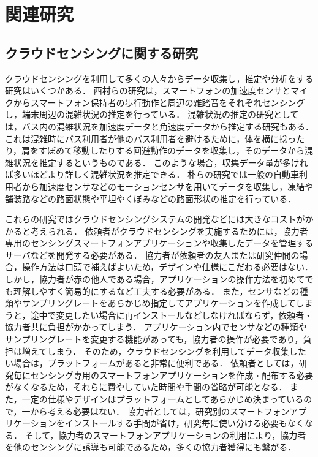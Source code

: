 \thispagestyle{myheadings}
\chapter{関連研究}
\label{sec:format}


\section{クラウドセンシングに関する研究}
\label{sec:format_thesis}
クラウドセンシングを利用して多くの人々からデータ収集し，推定や分析をする研究はいくつかある．
西村らの研究\cite{ura}は，スマートフォンの加速度センサとマイクからスマートフォン保持者の歩行動作と周辺の雑踏音をそれぞれセンシングし，端末周辺の混雑状況の推定を行っている．
混雑状況の推定の研究としては，バス内の混雑状況を加速度データと角速度データから推定する研究\cite{hoso}もある．
これは混雑時にバス利用者が他のバス利用者を避けるために，体を横に捻ったり，肩をすぼめて移動したりする回避動作のデータを収集し，そのデータから混雑状況を推定するというものである．
このような場合，収集データ量が多ければ多いほどより詳しく混雑状況を推定できる．
朴らの研究\cite{paku}では一般の自動車利用者から加速度センサなどのモーションセンサを用いてデータを収集し，凍結や舗装路などの路面状態や平坦やくぼみなどの路面形状の推定を行っている．

これらの研究ではクラウドセンシングシステムの開発などには大きなコストがかかると考えられる．
依頼者がクラウドセンシングを実施するためには，協力者専用のセンシングスマートフォンアプリケーションや収集したデータを管理するサーバなどを開発する必要がある．
協力者が依頼者の友人または研究仲間の場合，操作方法は口頭で補えばよいため，デザインや仕様にこだわる必要はない．
しかし，協力者が赤の他人である場合，アプリケーションの操作方法を初めてでも理解しやすく簡易的にするなど工夫する必要がある．
また，センサなどの種類やサンプリングレートをあらかじめ指定してアプリケーションを作成してしまうと，途中で変更したい場合に再インストールなどしなければならず，依頼者・協力者共に負担がかかってしまう．
アプリケーション内でセンサなどの種類やサンプリングレートを変更する機能があっても，協力者の操作が必要であり，負担は増えてしまう．
そのため，クラウドセンシングを利用してデータ収集したい場合は，プラットフォームがあると非常に便利である．
依頼者としては，研究毎にセンシング専用のスマートフォンアプリケーションを作成・配布する必要がなくなるため，それらに費やしていた時間や手間の省略が可能となる．
また，一定の仕様やデザインはプラットフォームとしてあらかじめ決まっているので，一から考える必要はない．
協力者としては，研究別のスマートフォンアプリケーションをインストールする手間が省け，研究毎に使い分ける必要もなくなる．
そして，協力者のスマートフォンアプリケーションの利用により，協力者を他のセンシングに誘導も可能であるため，多くの協力者獲得にも繋がる．


